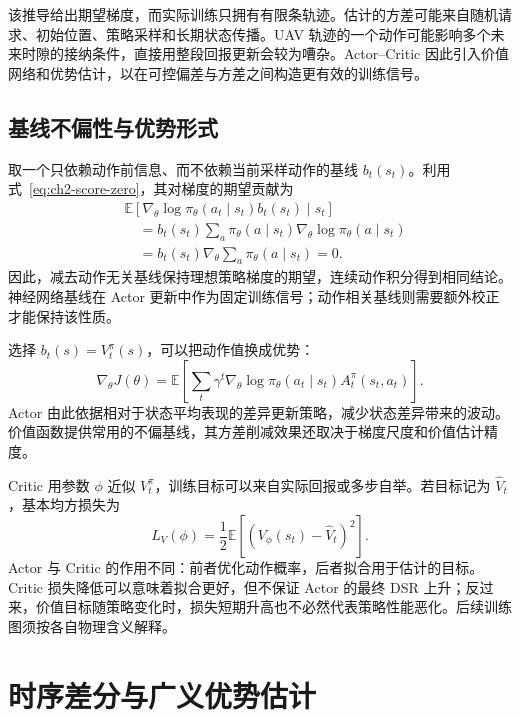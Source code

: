 该推导给出期望梯度，而实际训练只拥有有限条轨迹。估计的方差可能来自随机请求、初始位置、策略采样和长期状态传播。UAV 轨迹的一个动作可能影响多个未来时隙的接纳条件，直接用整段回报更新会较为嘈杂。Actor--Critic 因此引入价值网络和优势估计，以在可控偏差与方差之间构造更有效的训练信号。

\subsection{基线不偏性与优势形式}
\label{sec:ch2-baseline-proof}

取一个只依赖动作前信息、而不依赖当前采样动作的基线 $b_t(s_t)$。利用式~\eqref{eq:ch2-score-zero}，其对梯度的期望贡献为
\begin{align}
    &\mathbb E\left[\nabla_\theta\log\pi_\theta(a_t\mid s_t)b_t(s_t)\mid s_t\right]\\
    &\quad=b_t(s_t)\sum_a\pi_\theta(a\mid s_t)\nabla_\theta\log\pi_\theta(a\mid s_t)\\
    &\quad=b_t(s_t)\nabla_\theta\sum_a\pi_\theta(a\mid s_t)=0.
    \label{eq:ch2-baseline-unbiased}
\end{align}
因此，减去动作无关基线保持理想策略梯度的期望，连续动作积分得到相同结论。神经网络基线在 Actor 更新中作为固定训练信号；动作相关基线则需要额外校正才能保持该性质。

选择 $b_t(s)=V_t^\pi(s)$，可以把动作值换成优势：
\begin{equation}
    \nabla_\theta J(\theta)
    =\mathbb E\left[\sum_t\gamma^t
    \nabla_\theta\log\pi_\theta(a_t\mid s_t)A_t^\pi(s_t,a_t)\right].
    \label{eq:ch2-advantage-gradient}
\end{equation}
Actor 由此依据相对于状态平均表现的差异更新策略，减少状态差异带来的波动。价值函数提供常用的不偏基线，其方差削减效果还取决于梯度尺度和价值估计精度。

Critic 用参数 $\phi$ 近似 $V_t^\pi$，训练目标可以来自实际回报或多步自举。若目标记为 $\widehat V_t$，基本均方损失为
\begin{equation}
    L_V(\phi)=\frac{1}{2}\mathbb E\left[(V_\phi(s_t)-\widehat V_t)^2\right].
    \label{eq:ch2-value-loss}
\end{equation}
Actor 与 Critic 的作用不同：前者优化动作概率，后者拟合用于估计的目标。Critic 损失降低可以意味着拟合更好，但不保证 Actor 的最终 DSR 上升；反过来，价值目标随策略变化时，损失短期升高也不必然代表策略性能恶化。后续训练图须按各自物理含义解释。

\section{时序差分与广义优势估计}
\label{sec:ch2-gae}

